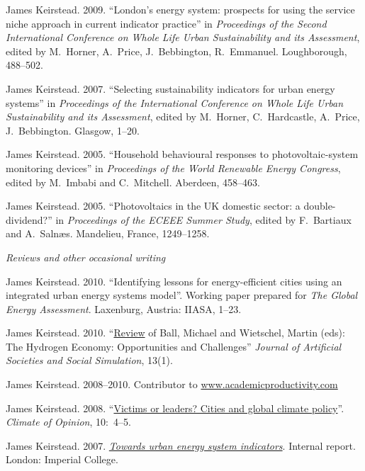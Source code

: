 \documentclass[11pt,a4paper]{article}
\begin{document}
\ind James Keirstead. 2009. ``London's energy system: prospects for using the service niche approach in current indicator practice'' in \emph{Proceedings of the Second International Conference on Whole Life Urban Sustainability and its Assessment}, edited by M.\ Horner, A.\ Price, J.\ Bebbington, R.\ Emmanuel.  Loughborough, 488--502.

\ind James Keirstead. 2007. ``Selecting sustainability indicators for urban energy systems'' in \emph{Proceedings of the International Conference on Whole Life Urban Sustainability and its Assessment}, edited by M.\ Horner, C.\ 
Hardcastle, A.\ Price, J.\ Bebbington. Glasgow, 1--20.

\ind James Keirstead. 2005. ``Household behavioural responses to photovoltaic-system monitoring devices'' in \emph{Proceedings of the World Renewable Energy Congress}, edited by M.\ Imbabi and C.\ Mitchell. Aberdeen, 458--463.

\ind James Keirstead. 2005. ``Photovoltaics in the UK domestic sector: a double-dividend?'' in \emph{Proceedings of the ECEEE Summer Study}, edited by F.\ Bartiaux and A.\ Saln{\ae}s. Mandelieu, France, 1249--1258.

\bigskip
 
\noindent\emph{Reviews and other occasional writing \vspace{0.05in}}


\ind James Keirstead. 2010. ``Identifying lessons for energy-efficient cities using an integrated urban energy systems model''.  Working paper prepared for \emph{The Global Energy Assessment}.  Laxenburg, Austria: IIASA, 1--23.

\ind James Keirstead. 2010. ``\href{http://jasss.soc.surrey.ac.uk/13/1/reviews/keirstead.html}{Review} of Ball, Michael and Wietschel, Martin (eds): The Hydrogen Economy: Opportunities and Challenges'' \emph{Journal of Artificial Societies and Social Simulation}, 13(1).

\ind James Keirstead. 2008--2010.  Contributor to \href{http://www.academicproductivity.com}{www.academicproductivity.com}

\ind James Keirstead. 2008. ``\href{http://www.stockholm-network.org/downloads/publications/Climate_of_Opinion_10.pdf}{Victims or leaders? Cities and global climate policy}''. \emph{Climate of Opinion}, 10:~4--5.

\ind James Keirstead. 2007.  \href{http://www3.imperial.ac.uk/pls/portallive/docs/1/24897696.PDF}{\emph{Towards urban energy system indicators}}.  Internal report. London: Imperial College.
\end{document}
